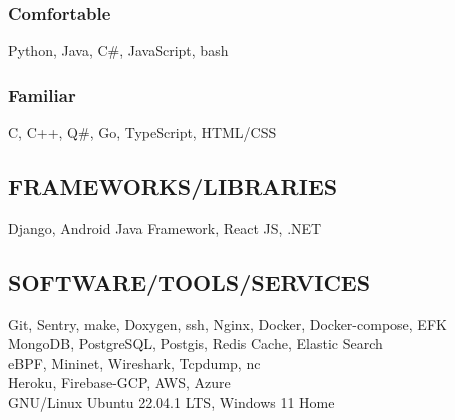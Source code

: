 \documentclass[letterpaper]{deedy-resume} %
\begin{document}
\begin{minipage}[t]{0.33\textwidth}
\subsubsection*{Comfortable}
\squeezeup
Python, Java, C\#, JavaScript, bash
\subsectionspace %
\subsubsection*{Familiar}
\squeezeup
C, C++, Q\#, Go, TypeScript, HTML/CSS

\sectionspace %

\subsection{FRAMEWORKS/LIBRARIES}
Django, Android Java Framework, React JS, .NET

\sectionspace %

\subsection{SOFTWARE/TOOLS/SERVICES}
Git, Sentry, make, Doxygen, ssh, Nginx, Docker, Docker-compose, EFK \\
MongoDB, PostgreSQL, Postgis, Redis Cache, Elastic Search \\
eBPF, Mininet, Wireshark, Tcpdump, nc \\
Heroku, Firebase-GCP, AWS, Azure \\
GNU/Linux Ubuntu 22.04.1 LTS, Windows 11 Home


\sectionspace %




\end{minipage}
\end{document}
